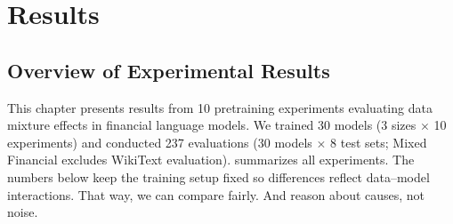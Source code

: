 \chapter{Results}


\section{Overview of Experimental Results}

This chapter presents results from 10 pretraining experiments evaluating data mixture effects in financial language models. We trained 30 models (3 sizes $\times$ 10 experiments) and conducted 237 evaluations (30 models $\times$ 8 test sets; Mixed Financial excludes WikiText evaluation).  summarizes all experiments. The numbers below keep the training setup fixed so differences reflect data–model interactions. That way, we can compare fairly. And reason about causes, not noise.

